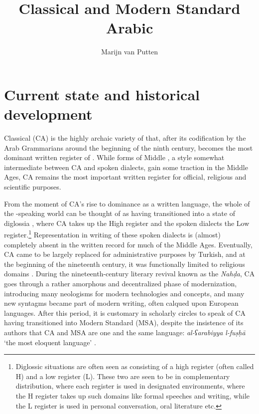 \documentclass[output=paper]{langsci/langscibook}
\author{Marijn van Putten\affiliation{University of Leiden}}
\title{Classical and Modern Standard Arabic}
\begin{document}
\maketitle 
\let\textstyleannotationreference\relax{}
\section{Current state and historical development}

Classical  (CA) is the highly archaic variety of  that, after its codification by the Arab Grammarians around the beginning of the ninth century, becomes the most dominant written {register} of . While forms of Middle , a style somewhat intermediate between CA and spoken dialects, gain some traction in the Middle Ages, CA remains the most important written {register} for official, religious and scientific purposes. 

From the moment of CA’s rise to dominance as a written language, the whole of the -speaking world can be thought of as having transitioned into a state of {diglossia} \citep{Ferguson1959,Ferguson1996}, where CA takes up the High {register} and the spoken dialects the Low {register}.\footnote{Diglossic situations are often seen as consisting of a high {register} (often called H) and a low {register} (L). These two are seen to be in complementary distribution, where each {register} is used in designated environments, where the H {register} takes up such domains like formal speeches and writing, while the L {register} is used in personal conversation, oral literature etc.} Representation in writing of these spoken dialects is (almost) completely absent in the written record for much of the Middle Ages. Eventually, CA came to be largely replaced for administrative purposes by  {Turkish}, and at the beginning of the nineteenth century, it was functionally limited to religious domains \citep[836]{Glaß2011}. During the nineteenth-century  literary revival known as the \textit{Nahḍa}, CA goes through a rather amorphous and decentralized phase of modernization, introducing many neologisms for modern technologies and concepts, and many new syntagms became part of modern writing, often calqued upon European languages. After this period, it is customary in scholarly circles to speak of CA having transitioned into Modern Standard  (MSA), despite the insistence of its authors that CA and MSA are one and the same language: \textit{al-ʕarabiyya} \textit{l-fuṣḥā} ‘the most eloquent  language’ \citep[845]{Ryding2011}.
\end{document}
